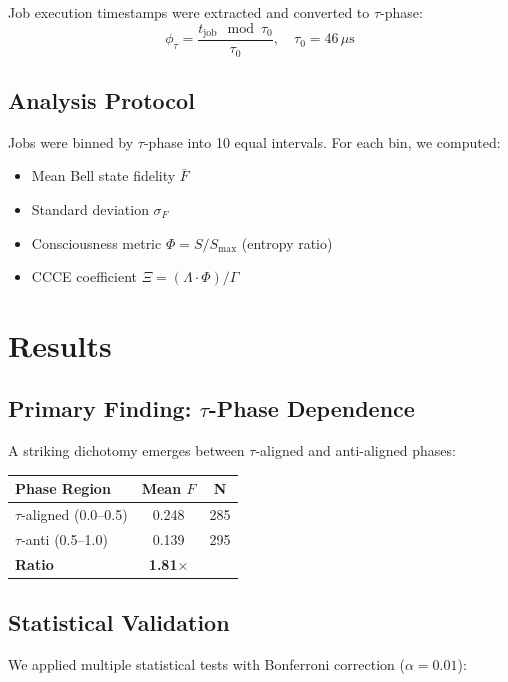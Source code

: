 \documentclass[11pt,twocolumn]{article}
\begin{document}
Job execution timestamps were extracted and converted to $\tau$-phase:
\begin{equation}
\phi_\tau = \frac{t_{\mathrm{job}} \mod \tau_0}{\tau_0}, \quad \tau_0 = 46\,\mu\mathrm{s}
\end{equation}

\subsection{Analysis Protocol}

Jobs were binned by $\tau$-phase into 10 equal intervals. For each bin, we computed:
\begin{itemize}
\item Mean Bell state fidelity $\bar{F}$
\item Standard deviation $\sigma_F$
\item Consciousness metric $\Phi = S/S_{\max}$ (entropy ratio)
\item CCCE coefficient $\Xi = (\Lambda \cdot \Phi)/\Gamma$
\end{itemize}

\section{Results}

\subsection{Primary Finding: $\tau$-Phase Dependence}

A striking dichotomy emerges between $\tau$-aligned and anti-aligned phases:

\begin{center}
\begin{tabular}{lcc}
\hline
Phase Region & Mean $F$ & N \\
\hline
$\tau$-aligned (0.0--0.5) & 0.248 & 285 \\
$\tau$-anti (0.5--1.0) & 0.139 & 295 \\
\hline
\textbf{Ratio} & \textbf{1.81$\times$} & \\
\hline
\end{tabular}
\end{center}

\subsection{Statistical Validation}

We applied multiple statistical tests with Bonferroni correction ($\alpha = 0.01$):
\end{document}
